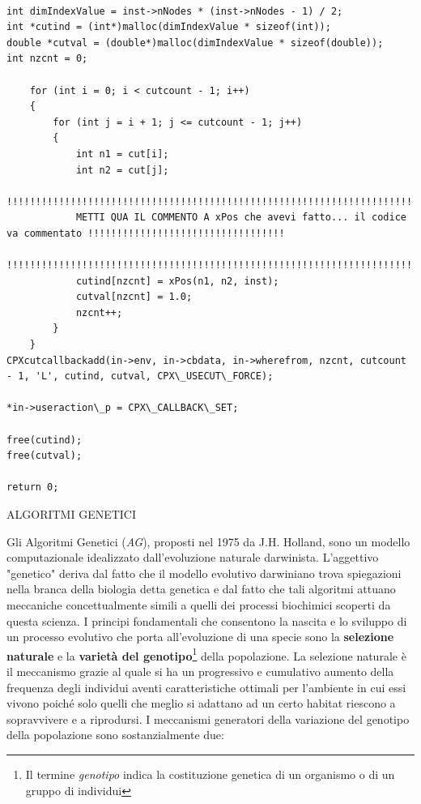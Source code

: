 \documentclass[11pt]{article}
\begin{document}
\begin{lstlisting}

int dimIndexValue = inst->nNodes * (inst->nNodes - 1) / 2;
int *cutind = (int*)malloc(dimIndexValue * sizeof(int));
double *cutval = (double*)malloc(dimIndexValue * sizeof(double));
int nzcnt = 0;

    for (int i = 0; i < cutcount - 1; i++)
    {
        for (int j = i + 1; j <= cutcount - 1; j++)
        {
            int n1 = cut[i];
            int n2 = cut[j];
            !!!!!!!!!!!!!!!!!!!!!!!!!!!!!!!!!!!!!!!!!!!!!!!!!!!!!!!!!!!!!!!!!!!!!!!!!!!!!!!!!!!!!!!!!!!!!!!!!!!!!!!!!!
            METTI QUA IL COMMENTO A xPos che avevi fatto... il codice va commentato !!!!!!!!!!!!!!!!!!!!!!!!!!!!!!!!!!
            !!!!!!!!!!!!!!!!!!!!!!!!!!!!!!!!!!!!!!!!!!!!!!!!!!!!!!!!!!!!!!!!!!!!!!!!!!!!!!!!!!!!!!!!!!!!!!!!!!!!!!!!!!
            cutind[nzcnt] = xPos(n1, n2, inst);
            cutval[nzcnt] = 1.0;
            nzcnt++;
        }
    }
CPXcutcallbackadd(in->env, in->cbdata, in->wherefrom, nzcnt, cutcount - 1, 'L', cutind, cutval, CPX\_USECUT\_FORCE);

*in->useraction\_p = CPX\_CALLBACK\_SET;

free(cutind);
free(cutval);

return 0;

\end{lstlisting}



\vspace{2\baselineskip}
ALGORITMI GENETICI
\vspace{2\baselineskip}


Gli Algoritmi Genetici (\textit{AG}), proposti nel 1975 da J.H. Holland, sono un modello computazionale idealizzato dall'evoluzione naturale darwinista. L'aggettivo "genetico" deriva dal fatto che il modello evolutivo darwiniano trova spiegazioni nella branca della biologia detta genetica e dal fatto che tali algoritmi attuano meccaniche concettualmente simili a quelli dei processi biochimici scoperti da questa scienza. I principi fondamentali che consentono la nascita e lo sviluppo di un processo evolutivo che porta all'evoluzione di una specie sono la \textbf{selezione naturale} e la \textbf{varietà del genotipo}\footnote{Il termine \textit{genotipo} indica la costituzione genetica di un organismo o di un gruppo di individui} della popolazione.
La selezione naturale è il meccanismo grazie al quale si ha un progressivo e cumulativo aumento della frequenza degli individui aventi caratteristiche ottimali per l'ambiente in cui essi vivono poiché solo quelli che meglio si adattano ad un certo habitat riescono a sopravvivere e a riprodursi.
I meccanismi generatori della variazione del genotipo della popolazione sono sostanzialmente due:
\end{document}

